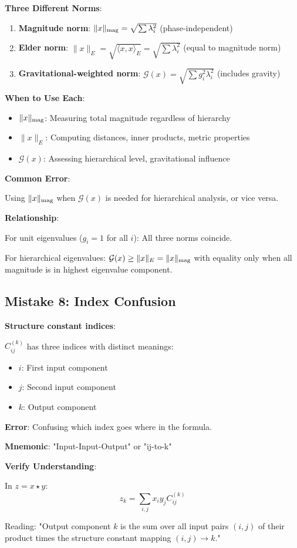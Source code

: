 \begin{warning}
\textbf{Three Different Norms}:

\begin{enumerate}
\item \textbf{Magnitude norm}: $\|x\|_{\text{mag}} = \sqrt{\sum \lambda_i^2}$ (phase-independent)
\item \textbf{Elder norm}: $\|x\|_E = \sqrt{\langle x,x \rangle_E} = \sqrt{\sum \lambda_i^2}$ (equal to magnitude norm)
\item \textbf{Gravitational-weighted norm}: $\mathcal{G}(x) = \sqrt{\sum g_i^2 \lambda_i^2}$ (includes gravity)
\end{enumerate}

\textbf{When to Use Each}:

\begin{itemize}
\item $\|x\|_{\text{mag}}$: Measuring total magnitude regardless of hierarchy
\item $\|x\|_E$: Computing distances, inner products, metric properties  
\item $\mathcal{G}(x)$: Assessing hierarchical level, gravitational influence
\end{itemize}

\textbf{Common Error}:

Using $\|x\|_{\text{mag}}$ when $\mathcal{G}(x)$ is needed for hierarchical analysis, or vice versa.

\textbf{Relationship}:

For unit eigenvalues ($g_i = 1$ for all $i$): All three norms coincide.

For hierarchical eigenvalues: $\mathcal{G}(x) \geq \|x\|_E = \|x\|_{\text{mag}}$ with equality only when all magnitude is in highest eigenvalue component.
\end{warning}

\subsection{Mistake 8: Index Confusion}

\begin{warning}
\textbf{Structure constant indices}:

$C_{ij}^{(k)}$ has three indices with distinct meanings:
\begin{itemize}
\item $i$: First input component
\item $j$: Second input component  
\item $k$: Output component
\end{itemize}

\textbf{Error}: Confusing which index goes where in the formula.

\textbf{Mnemonic}: "Input-Input-Output" or "ij-to-k"

\textbf{Verify Understanding}:

In $z = x \star y$:
$$z_k = \sum_{i,j} x_i y_j C_{ij}^{(k)}$$

Reading: "Output component $k$ is the sum over all input pairs $(i,j)$ of their product times the structure constant mapping $(i,j) \to k$."
\end{warning}

